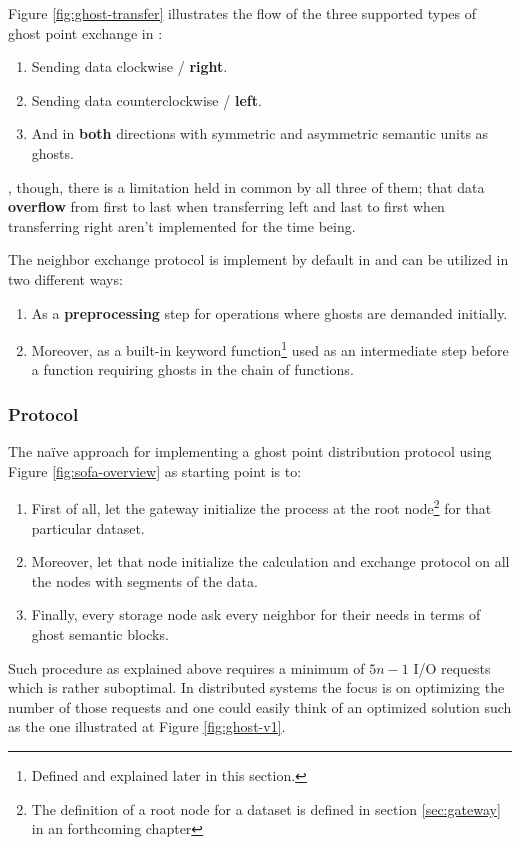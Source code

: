 Figure \ref{fig:ghost-transfer} illustrates the flow of the three supported types of ghost point exchange in \CodeName:

\begin{enumerate}
	\item Sending data clockwise / \textbf{right}.
	\item Sending data counterclockwise / \textbf{left}.
	\item And in \textbf{both} directions with symmetric and asymmetric semantic units as ghosts.
\end{enumerate}
\vspace*{2mm}
, though, there is a limitation held in common by all three of them; that data \textbf{overflow} from first to last when transferring left and last to first when transferring right aren't implemented for the time being.
\newline

The neighbor exchange protocol is implement by default in \CodeName and can be utilized in two different ways:

\begin{enumerate}
	\item As a \textbf{preprocessing} step for operations where ghosts are demanded initially.
	\item Moreover, as a built-in keyword function\footnote{Defined and explained later in this section.} used as an intermediate step before a function requiring ghosts in the chain of functions.
\end{enumerate}

\subsubsection*{Protocol}
The naïve approach for implementing a ghost point distribution protocol using Figure \ref{fig:sofa-overview} as starting point is to:
\begin{enumerate}
	\item First of all, let the gateway initialize the process at the root node\footnote{The definition of a root node for a dataset is defined in section \ref{sec:gateway} in an forthcoming chapter} for that particular dataset.
	\item Moreover, let that node initialize the calculation and exchange protocol on all the nodes with segments of the data.
	\item Finally, every storage node ask every neighbor for their needs in terms of ghost semantic blocks.
\end{enumerate}
\vspace*{2mm}
Such procedure as explained above requires a minimum of $5n-1$ I/O requests which is rather suboptimal. In distributed systems the focus is on optimizing the number of those requests and one could easily think of an optimized solution such as the one illustrated at Figure \ref{fig:ghost-v1}. 

